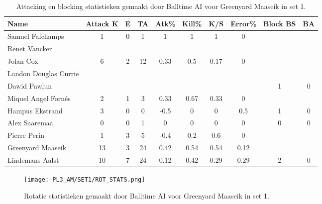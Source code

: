 \begin{table}[ht!]
  \centering
  \scriptsize
  \begin{tabular}{|l|c|c|c|c|c|c|c|c|c|} \hline
    \textbf{Name} & Attack K & E & TA & Atk\% & Kill\% & K/S & Error\% & Block BS & BA \\ \hline
    Samuel Fafchamps & 1 & 0 & 1 & 1 & 1 & 1 & 0 &   &   \\
    Renet Vancker &   &   &   &   &   &   &   &   &   \\
    Jolan Cox & 6 & 2 & 12 & 0.33 & 0.5 & 0.17 & 0 &   &   \\
    Landon Douglas Currie &   &   &   &   &   &   &   &   &   \\
    Dawid Pawlun &   &   &   &   &   &   &   & 1 & 0 \\
    Miquel Angel Fornés & 2 & 1 & 3 & 0.33 & 0.67 & 0.33 & 0 &   &   \\
    Hampus Ekstrand & 3 & 0 & 0 & -0.5 & 0 & 0 & 0.5 & 1 & 0 \\
    Alex Saaremaa & 0 & 0 & 1 & 0 & 0 & 0 & 0 & 0 & 0 \\
    Pierre Perin & 1 & 3 & 5 & -0.4 & 0.2 & 0.6 & 0 &   &   \\
    Greenyard Maaseik & 13 & 3 & 24 & 0.42 & 0.54 & 0.54 & 0.12 &   &   \\
    Lindemans Aalst & 10 & 7 & 24 & 0.12 & 0.42 & 0.29 & 0.29 & 2 & 0 \\ \hline
  \end{tabular}
  \caption[Attacking en blocking statistieken gemaakt door Balltime AI voor Greenyard Maaseik in set 1]{\label{tab:PL3AttBlockMaaseik1}Attacking en blocking statistieken gemaakt door Balltime AI voor Greenyard Maaseik in set 1.}
\end{table}

\begin{figure}
  \centering
  \texttt{[image: PL3\_AM/SET1/ROT\_STATS.png]}
  \caption{\label{fig:PL3_ROT_STATS_1}Rotatie statistieken gemaakt door Balltime AI voor Greenyard Maaseik in set 1.}
\end{figure}
    
